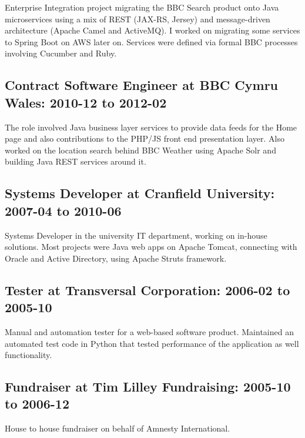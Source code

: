\documentclass[10pt]{article}
\begin{document}
Enterprise Integration project migrating
        the BBC Search product onto Java microservices using a mix of REST (JAX-RS, Jersey)
        and message-driven architecture (Apache Camel and ActiveMQ). I worked
        on migrating some services to Spring Boot on AWS later on.
        Services were defined via formal BBC processes involving Cucumber and Ruby.



\subsection*{Contract Software Engineer at BBC Cymru Wales: 2010-12 to 2012-02}

The role involved Java business layer services to provide data feeds for
the Home page and also contributions to the PHP/JS front end presentation layer. Also worked on the location search behind BBC Weather using Apache Solr and
building Java REST services around it.



\subsection*{Systems Developer at Cranfield University: 2007-04 to 2010-06}

Systems Developer in the university IT department,
        working on in-house solutions. Most projects were Java web apps
        on Apache Tomcat, connecting with Oracle and Active Directory,
        using Apache Struts framework.



\subsection*{Tester at Transversal Corporation: 2006-02 to 2005-10}

Manual and automation tester for a
web-based software product. Maintained an automated test code in Python that
tested performance of the application as well functionality.



\subsection*{Fundraiser at Tim Lilley Fundraising: 2005-10 to 2006-12}

House to house fundraiser on behalf of Amnesty International.
\end{document}

